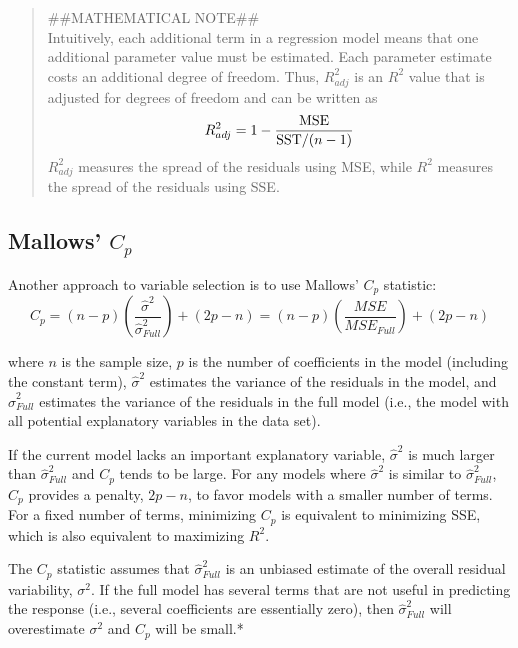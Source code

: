 \documentclass[
]{report}
\theoremstyle{definition}
\theoremstyle{definition}
\theoremstyle{definition}
\theoremstyle{definition}
\theoremstyle{remark}
\begin{document}
\begin{quote}
\#\#MATHEMATICAL NOTE\#\#\\
Intuitively, each additional term in a regression model means that one additional parameter value must be estimated. Each parameter estimate costs an additional degree of freedom. Thus, \(R^2_{adj}\) is an \(R^2\) value that is adjusted for degrees of freedom and can be written as
\begin{equation}
R^2_{adj} = 1 - \frac{\text{MSE}}{\text{SST}/(n - 1)} \notag
\end{equation}
\(R^2_{adj}\) measures the spread of the residuals using MSE, while \(R^2\) measures the spread of the residuals using SSE.
\end{quote}

\hypertarget{mallows-c_p}{%
\subsection{\texorpdfstring{Mallows' \(C_p\)}{Mallows' C\_p}}\label{mallows-c_p}}

Another approach to variable selection is to use Mallows' \(C_p\) statistic:
\begin{equation}
C_p = (n - p)\left(\frac{\hat{\sigma}^2}{\hat{\sigma}^2_{Full}}\right) + (2p - n)
= (n - p)\left(\frac{MSE}{MSE_{Full}}\right) + (2p - n)
\tag{3.14}
\end{equation}

where \(n\) is the sample size, \(p\) is the number of coefficients in the model (including the constant term), \(\hat{\sigma}^2\) estimates the variance of the residuals in the model, and \(\hat{\sigma}^2_{Full}\) estimates the variance of the residuals in the full model (i.e., the model with all potential explanatory variables in the data set).

If the current model lacks an important explanatory variable, \(\hat{\sigma}^2\) is much larger than \(\hat{\sigma}^2_{Full}\) and \(C_p\) tends to be large. For any models where \(\hat{\sigma}^2\) is similar to \(\hat{\sigma}^2_{Full}\), \(C_p\) provides a penalty, \(2p - n\), to favor models with a smaller number of terms. For a fixed number of terms, minimizing \(C_p\) is equivalent to minimizing SSE, which is also equivalent to maximizing \(R^2\).

The \(C_p\) statistic assumes that \(\hat{\sigma}^2_{Full}\) is an unbiased estimate of the overall residual variability, \(\sigma^2\). If the full model has several terms that are not useful in predicting the response (i.e., several coefficients are essentially zero), then \(\hat{\sigma}^2_{Full}\) will overestimate \(\sigma^2\) and \(C_p\) will be small.*
\end{document}
